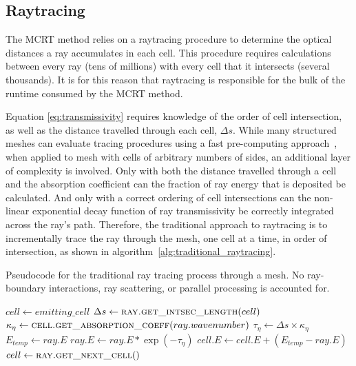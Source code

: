 \subsection{Raytracing}
The MCRT method relies on a raytracing procedure to determine the optical distances a ray accumulates in each cell. This procedure requires calculations between every ray (tens of millions) with every cell that it intersects (several thousands). 
It is for this reason that raytracing is responsible for the bulk of the runtime consumed by the MCRT method.

Equation \ref{eq:transmissivity} requires knowledge of the order of cell intersection, as well as the distance travelled through each cell, $\Delta{}s$. While many structured meshes can evaluate tracing procedures using a fast pre-computing approach~\cite{Amanatides1987ATracing}, when applied to mesh with cells of arbitrary numbers of sides, an additional layer of complexity is involved.
Only with both the distance travelled through a cell and the absorption coefficient can the fraction of ray energy that is deposited be calculated.
And only with a correct ordering of cell intersections can the non-linear exponential decay function of ray transmissivity be correctly integrated across the ray's path.
Therefore, the traditional approach to raytracing is to incrementally trace the ray through the mesh, one cell at a time, in order of intersection, as shown in algorithm~\ref{alg:traditional_raytracing}.

\begin{algorithm}
    \caption{Pseudocode for the traditional ray tracing process through a mesh. No ray-boundary interactions, ray scattering, or parallel processing is accounted for.}
    \label{alg:traditional_raytracing}
    \begin{algorithmic}[1] %

                    \State {} 
                    \State $cell\gets emitting\_cell$
                        \State $\Delta{s} \gets \Call{ray.get\_intsec\_length}{cell}$
                        \State $\kappa{}_\eta{} \gets \Call{cell.get\_absorption\_coeff}{ray.wavenumber}$
                        \State $\tau_\eta{} \gets \Delta{s}\times{\kappa{}_\eta{}}$ 
                        \State $E_{temp} \gets ray.E$
                        \State $ray.E \gets ray.E * \exp{(-\tau_\eta)}$
                        \State $cell.E \gets cell.E + (E_{temp} - ray.E)$
                        \State $cell \gets \Call{ray.get\_next\_cell}{ }$
                    \EndWhile
                \EndFor
            \EndFor
        \EndProcedure
        
    \end{algorithmic}
\end{algorithm}

